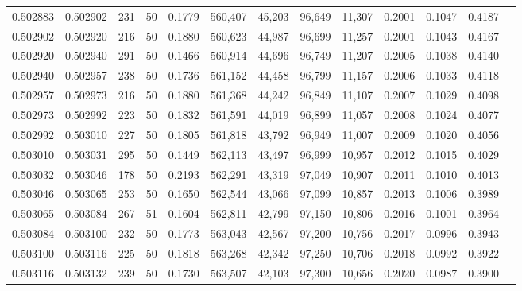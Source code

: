 \begin{tabular}{rrrrrrrrrrrrr}
0.502883 & 0.502902 & 231 &  50 &                                     0.1779 & 560,407 &  45,203 &  96,649 &  11,307 & 0.2001 & 0.1047 & 0.4187 \\
0.502902 & 0.502920 & 216 &  50 &                                     0.1880 & 560,623 &  44,987 &  96,699 &  11,257 & 0.2001 & 0.1043 & 0.4167 \\
0.502920 & 0.502940 & 291 &  50 &                                     0.1466 & 560,914 &  44,696 &  96,749 &  11,207 & 0.2005 & 0.1038 & 0.4140 \\
0.502940 & 0.502957 & 238 &  50 &                                     0.1736 & 561,152 &  44,458 &  96,799 &  11,157 & 0.2006 & 0.1033 & 0.4118 \\
0.502957 & 0.502973 & 216 &  50 &                                     0.1880 & 561,368 &  44,242 &  96,849 &  11,107 & 0.2007 & 0.1029 & 0.4098 \\
0.502973 & 0.502992 & 223 &  50 &                                     0.1832 & 561,591 &  44,019 &  96,899 &  11,057 & 0.2008 & 0.1024 & 0.4077 \\
0.502992 & 0.503010 & 227 &  50 &                                     0.1805 & 561,818 &  43,792 &  96,949 &  11,007 & 0.2009 & 0.1020 & 0.4056 \\
0.503010 & 0.503031 & 295 &  50 &                                     0.1449 & 562,113 &  43,497 &  96,999 &  10,957 & 0.2012 & 0.1015 & 0.4029 \\
0.503032 & 0.503046 & 178 &  50 &                                     0.2193 & 562,291 &  43,319 &  97,049 &  10,907 & 0.2011 & 0.1010 & 0.4013 \\
0.503046 & 0.503065 & 253 &  50 &                                     0.1650 & 562,544 &  43,066 &  97,099 &  10,857 & 0.2013 & 0.1006 & 0.3989 \\
0.503065 & 0.503084 & 267 &  51 &                                     0.1604 & 562,811 &  42,799 &  97,150 &  10,806 & 0.2016 & 0.1001 & 0.3964 \\
0.503084 & 0.503100 & 232 &  50 &                                     0.1773 & 563,043 &  42,567 &  97,200 &  10,756 & 0.2017 & 0.0996 & 0.3943 \\
0.503100 & 0.503116 & 225 &  50 &                                     0.1818 & 563,268 &  42,342 &  97,250 &  10,706 & 0.2018 & 0.0992 & 0.3922 \\
0.503116 & 0.503132 & 239 &  50 &                                     0.1730 & 563,507 &  42,103 &  97,300 &  10,656 & 0.2020 & 0.0987 & 0.3900 \\

\end{tabular}
